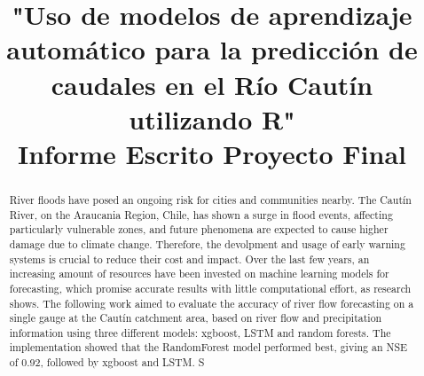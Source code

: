 \documentclass[hess, manuscript]{copernicus}
\begin{document}
\title{"Uso de modelos de aprendizaje automático para la predicción de caudales en el Río Cautín utilizando R" \\
Informe Escrito Proyecto Final}











\received{}
\pubdiscuss{} %
\revised{}
\accepted{}
\published{}



\maketitle

\begin{abstract}
  River floods have posed an ongoing risk for cities and communities nearby. The Cautín River, on the Araucania Region, Chile, has shown a surge in flood events, affecting particularly vulnerable zones, and future phenomena are expected to cause higher damage due to climate change. Therefore, the devolpment and usage of early warning systems is crucial to reduce their cost and impact. Over the last few years, an increasing amount of resources have been invested on machine learning models for forecasting, which promise accurate results with little computational effort, as research shows. The following work aimed to evaluate the accuracy of river flow forecasting on a single gauge at the Cautín catchment area, based on river flow and precipitation information using three different models: xgboost, LSTM and random forests. The implementation showed that the RandomForest model performed best, giving an NSE of 0.92, followed by xgboost and LSTM. S
\end{abstract}
\end{document}
